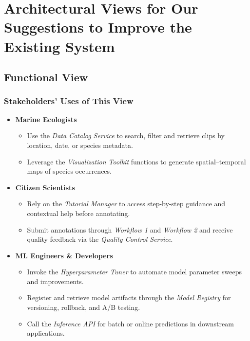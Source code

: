 \chapter{Architectural Views for Our Suggestions to Improve the Existing System} \label{suggest}

\section{Functional View}

\subsection{Stakeholders’ Uses of This View}

\begin{itemize}
  \item \textbf{Marine Ecologists}
    \begin{itemize}
      \item Use the \emph{Data Catalog Service} to search, filter and retrieve clips by location, date, or species metadata.
      \item Leverage the \emph{Visualization Toolkit} functions to generate spatial–temporal maps of species occurrences.
    \end{itemize}

  \item \textbf{Citizen Scientists}
    \begin{itemize}
      \item Rely on the \emph{Tutorial Manager} to access step-by-step guidance and contextual help before annotating.
      \item Submit annotations through \emph{Workflow 1} and \emph{Workflow 2} and receive quality feedback via the \emph{Quality Control Service}.
    \end{itemize}
  \newpage
  \item \textbf{ML Engineers \& Developers}
    \begin{itemize}
      \item Invoke the \emph{Hyperparameter Tuner} to automate model parameter sweeps and improvements.
      \item Register and retrieve model artifacts through the \emph{Model Registry} for versioning, rollback, and A/B testing.
      \item Call the \emph{Inference API} for batch or online predictions in downstream applications.
    \end{itemize}


\end{itemize}
